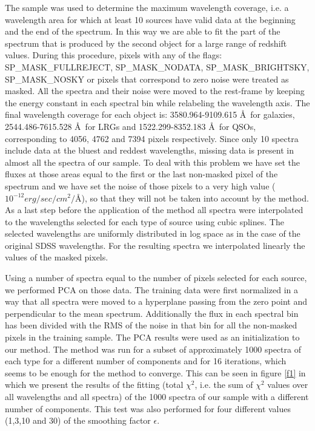 \documentclass[12pt,preprint]{aastex}
\begin{document}
The sample was used to determine the maximum wavelength coverage, i.e. a wavelength area for which at least 10 sources have valid data at the beginning and the end of the spectrum. In this way we are able to fit the part of the spectrum that is produced by the second object for a large range of redshift values. During this procedure, pixels with any of the flags: SP\_MASK\_FULLREJECT, SP\_MASK\_NODATA, SP\_MASK\_BRIGHTSKY, SP\_MASK\_NOSKY or pixels that correspond to zero noise were treated as masked. All the spectra and their noise were moved to the rest-frame by keeping the energy constant in each spectral bin while relabeling the wavelength axis.  The final wavelength coverage for each object is: 3580.964-9109.615 \AA\ for galaxies, 2544.486-7615.528 \AA\ for LRGs and 1522.299-8352.183 \AA\ for QSOs, corresponding to 4056, 4762 and 7394 pixels respectively. Since only 10 spectra include data at the bluest and reddest wavelengths, missing data is present in almost all the spectra of our sample. To deal with this problem we have set the fluxes at those areas equal to the first or the last non-masked pixel of the spectrum and we have set the noise of those pixels to a very high value ($10^{-12} erg/sec/cm^2/$\AA), so that they will not be taken into account by the method. As a last step before the application of the method all spectra were interpolated to the wavelengths selected for each type of source using cubic splines. The selected wavelengths are uniformly distributed in log space as in the case of the original SDSS wavelengths. For the resulting spectra we interpolated linearly the values of the masked pixels.

Using a number of spectra equal to the number of pixels selected for each source, we performed PCA on those data. The training data were first normalized in a way that all spectra were moved to a hyperplane passing from the zero point and perpendicular to the mean spectrum. Additionally the flux in each spectral bin has been divided with the RMS of the noise in that bin for all the non-masked pixels in the training sample. The PCA results were used as an initialization to our method. The method was run for a subset of approximately 1000 spectra of each type for a different number of components and for 16 iterations, which seems to be enough for the method to converge. This can be seen in figure \ref{f1} in which we present the results of the fitting (total $\chi^2$, i.e. the sum of $\chi^2$ values over all wavelengths and all spectra) of the 1000 spectra of our sample with a different number of components. This test was also performed for four different values (1,3,10 and 30) of the smoothing factor $\epsilon$.
\end{document}
